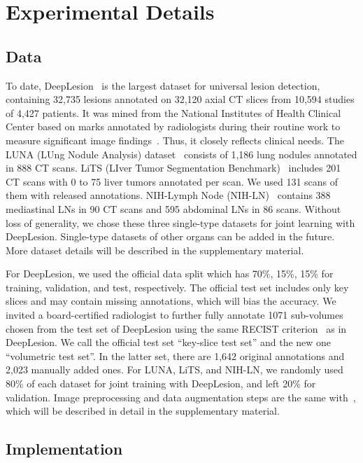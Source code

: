 \documentclass[runningheads]{llncs}
\begin{document}
\section{Experimental Details}
\label{sec:exp}

\subsection{Data}
\label{subsec:data}

To date, DeepLesion~\cite{Yan2018DeepLesion} is the largest dataset for universal lesion detection, containing 32,735 lesions annotated on 32,120 axial CT slices from 10,594 studies of 4,427 patients. It was mined from the National Institutes of Health Clinical Center based on marks annotated by radiologists during their routine work to measure significant image findings~\cite{Eisenhauer2009RECIST}. Thus, it closely reflects clinical needs. The LUNA (LUng Nodule Analysis) dataset~\cite{Setio2017LUNA} consists of 1,186 lung nodules annotated in 888 CT scans. LiTS (LIver Tumor Segmentation Benchmark)~\cite{Bilic2019LiTS} includes 201 CT scans with 0 to 75 liver tumors annotated per scan. We used 131 scans of them with released annotations. NIH-Lymph Node (NIH-LN)~\cite{NIH_LN_dataset} contains 388 mediastinal LNs in 90 CT scans and 595 abdominal LNs in 86 scans. Without loss of generality, we chose these three single-type datasets for joint learning with DeepLesion. Single-type datasets of other organs can be added in the future. More dataset details will be described in the supplementary material.

For DeepLesion, we used the official data split which has 70\%, 15\%, 15\% for training, validation, and test, respectively. The official test set includes only key slices and may contain missing annotations, which will bias the accuracy. We invited a board-certified radiologist to further fully annotate 1071 sub-volumes chosen from the test set of DeepLesion using the same RECIST criterion~\cite{Eisenhauer2009RECIST} as in DeepLesion. We call the official test set ``key-slice test set'' and the new one ``volumetric test set''. In the latter set, there are 1,642 original annotations and 2,023 manually added ones. For LUNA, LiTS, and NIH-LN, we randomly used 80\% of each dataset for joint training with DeepLesion, and left 20\% for validation. Image preprocessing and data augmentation steps are the same with~\cite{Yan2019MULAN}, which will be described in detail in the supplementary material.

\subsection{Implementation}
\label{subsec:implementation}
\end{document}
